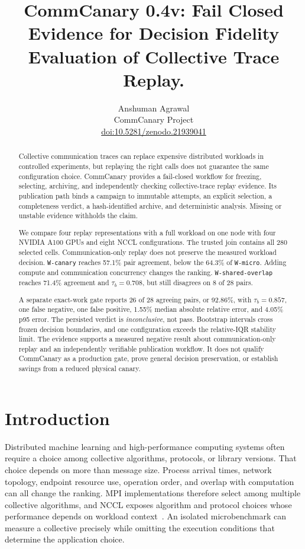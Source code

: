 \documentclass[10pt,twocolumn]{article}
\title{\vspace{-1.5em}\bfseries\color{paperblue}
  CommCanary 0.4v: Fail Closed Evidence for Decision Fidelity\\
  Evaluation of Collective Trace Replay.}
\author{Anshuman Agrawal\\[-0.1em]
  \small CommCanary Project\\[-0.1em]
  \small\href{https://doi.org/10.5281/zenodo.21939041}{doi:10.5281/zenodo.21939041}}
\date{}
\newcommand{\wname}[1]{\texttt{W-#1}}
\begin{document}
\maketitle
\vspace{-1.7em}

\begin{abstract}
Collective communication traces can replace expensive distributed workloads in
controlled experiments, but replaying the right calls does not guarantee the
same configuration choice. CommCanary provides a fail-closed workflow for
freezing, selecting, archiving, and independently checking collective-trace
replay evidence. Its publication path binds a campaign to immutable attempts,
an explicit selection, a completeness verdict, a hash-identified archive, and
deterministic analysis. Missing or unstable evidence withholds the claim.

We compare four replay representations with a full workload on one node with
four NVIDIA A100 GPUs and eight NCCL configurations. The trusted join contains
all 280 selected cells. Communication-only replay does not preserve the
measured workload decision. \wname{canary} reaches 57.1\% pair agreement, below
the 64.3\% of \wname{micro}. Adding compute and communication concurrency
changes the ranking. \wname{shared-overlap} reaches 71.4\% agreement and
$\tau_b=0.708$, but still disagrees on 8 of 28 pairs.

A separate exact-work gate reports 26 of 28 agreeing pairs, or 92.86\%, with
$\tau_b=0.857$, one false negative, one false positive, 1.55\% median absolute
relative error, and 4.05\% p95 error. The persisted verdict is
\emph{inconclusive}, not pass. Bootstrap intervals cross frozen decision
boundaries, and one configuration exceeds the relative-IQR stability limit.
The evidence supports a measured negative result about communication-only
replay and an independently verifiable publication workflow. It does not
qualify CommCanary as a production gate, prove general decision preservation,
or establish savings from a reduced physical canary.
\end{abstract}

\section{Introduction}

Distributed machine learning and high-performance computing systems often
require a choice among collective algorithms, protocols, or library versions.
That choice depends on more than message size. Process arrival times, network
topology, endpoint resource use, operation order, and overlap with computation
can all change the ranking. MPI implementations therefore select among
multiple collective algorithms, and NCCL exposes algorithm and protocol
choices whose performance depends on workload context~\cite{mpi,nccl,thakur,vadhiyar}.
An isolated microbenchmark can measure a collective precisely while omitting
the execution conditions that determine the application choice.
\end{document}
